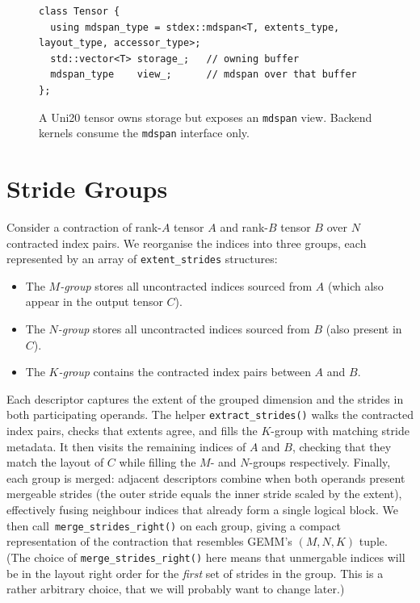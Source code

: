 \documentclass[11pt]{article}
\begin{document}
\begin{figure}[h]
  \centering
  \begin{minipage}{0.9\linewidth}
    \begin{lstlisting}
class Tensor {
  using mdspan_type = stdex::mdspan<T, extents_type, layout_type, accessor_type>;
  std::vector<T> storage_;   // owning buffer
  mdspan_type    view_;      // mdspan over that buffer
};
    \end{lstlisting}
  \end{minipage}
  \caption{A Uni20 tensor owns storage but exposes an \texttt{mdspan} view.  Backend kernels consume
  the \texttt{mdspan} interface only.}
  \label{fig:tensor-mdspan}
\end{figure}

\section{Stride Groups}
Consider a contraction of rank-$A$ tensor $A$ and rank-$B$ tensor $B$ over $N$ contracted index
pairs.  We reorganise the indices into three groups, each represented by an array of
\texttt{extent\_strides} structures:
\begin{itemize}
  \item The \emph{$M$-group} stores all uncontracted indices sourced from $A$ (which also appear in
        the output tensor $C$).
  \item The \emph{$N$-group} stores all uncontracted indices sourced from $B$ (also present in $C$).
  \item The \emph{$K$-group} contains the contracted index pairs between $A$ and $B$.
\end{itemize}
Each descriptor captures the extent of the grouped dimension and the strides in both participating
operands.  The helper \texttt{extract\_strides()} walks the contracted index pairs, checks that
extents agree, and fills the $K$-group with matching stride metadata.  It then visits the remaining
indices of $A$ and $B$, checking that they match the layout of $C$ while filling the $M$- and
$N$-groups respectively.  Finally, each group is merged: adjacent descriptors combine when both
operands present mergeable strides (the outer stride equals the inner stride scaled by the extent),
effectively fusing neighbour indices that already form a single logical block.  We then call\
\texttt{merge\_strides\_right()} on each group, giving a compact representation of the
contraction that resembles GEMM's $(M,N,K)$ tuple. (The choice of \texttt{merge\_strides\_right()} here
means that unmergable indices will be in the layout right order for the \emph{first} set of strides in the group.
This is a rather arbitrary choice, that we will probably want to change later.)
\end{document}
